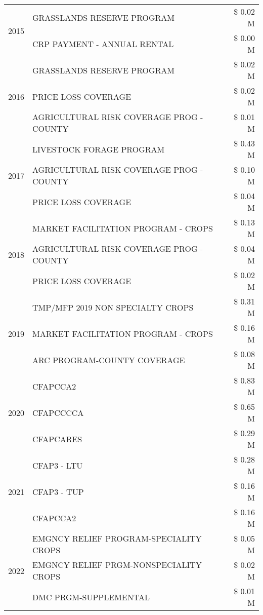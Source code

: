 \begin{tabular}{llr}
\cline{1-3}
\multirow[t]{2}{*}{2015} & GRASSLANDS RESERVE PROGRAM & \$ 0.02 M \\
 & CRP PAYMENT - ANNUAL RENTAL & \$ 0.00 M \\
\cline{1-3}
\multirow[t]{3}{*}{2016} & GRASSLANDS RESERVE PROGRAM & \$ 0.02 M \\
 & PRICE LOSS COVERAGE & \$ 0.02 M \\
 & AGRICULTURAL RISK COVERAGE PROG - COUNTY & \$ 0.01 M \\
\cline{1-3}
\multirow[t]{3}{*}{2017} & LIVESTOCK FORAGE PROGRAM & \$ 0.43 M \\
 & AGRICULTURAL RISK COVERAGE PROG - COUNTY & \$ 0.10 M \\
 & PRICE LOSS COVERAGE & \$ 0.04 M \\
\cline{1-3}
\multirow[t]{3}{*}{2018} & MARKET FACILITATION PROGRAM - CROPS & \$ 0.13 M \\
 & AGRICULTURAL RISK COVERAGE PROG - COUNTY & \$ 0.04 M \\
 & PRICE LOSS COVERAGE & \$ 0.02 M \\
\cline{1-3}
\multirow[t]{3}{*}{2019} & TMP/MFP 2019 NON SPECIALTY CROPS & \$ 0.31 M \\
 & MARKET FACILITATION PROGRAM - CROPS & \$ 0.16 M \\
 & ARC PROGRAM-COUNTY COVERAGE & \$ 0.08 M \\
\cline{1-3}
\multirow[t]{3}{*}{2020} & CFAPCCA2 & \$ 0.83 M \\
 & CFAPCCCCA & \$ 0.65 M \\
 & CFAPCARES & \$ 0.29 M \\
\cline{1-3}
\multirow[t]{3}{*}{2021} & CFAP3 - LTU & \$ 0.28 M \\
 & CFAP3 - TUP & \$ 0.16 M \\
 & CFAPCCA2 & \$ 0.16 M \\
\cline{1-3}
\multirow[t]{3}{*}{2022} & EMGNCY RELIEF PROGRAM-SPECIALITY CROPS & \$ 0.05 M \\
 & EMGNCY RELIEF PRGM-NONSPECIALITY CROPS & \$ 0.02 M \\
 & DMC PRGM-SUPPLEMENTAL & \$ 0.01 M \\
\cline{1-3}
\bottomrule
\end{tabular}

